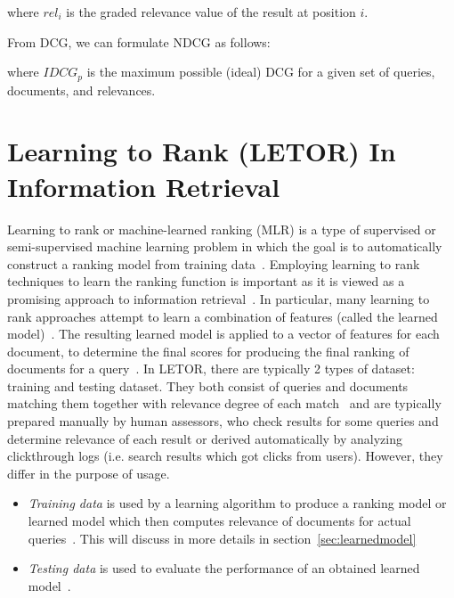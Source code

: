 \begin{center}
\end{center}

where $rel_{i}$ is the graded relevance value of the result at position $i$.

From DCG, we can formulate NDCG as follows:
\begin{center}
\end{center}
where $IDCG_p$ is the maximum possible (ideal) DCG for a given set of queries, documents, and relevances.


\section{Learning to Rank (LETOR) In Information Retrieval}\label{sec:letor}
Learning to rank or machine-learned ranking (MLR) is a type of supervised or semi-supervised machine learning problem in which the goal is 
to automatically construct a ranking model from training data~\cite{letor}.
Employing learning to rank techniques to learn the ranking function is important as it is viewed as
a promising approach to information retrieval~\cite{letor}. In particular, many learning to rank approaches attempt to learn a combination of features
(called the learned model)~\cite[P. 3]{learningmodel}. The resulting learned model is applied to a vector of features for each document, to determine the final scores for 
producing the final ranking of documents for a query~\cite[P. 3]{learningmodel}. In LETOR, there are typically 2 types of dataset: training and testing dataset.
They both consist of queries and documents matching them together with relevance degree of each match~\cite{letorWiki} and are typically
prepared manually by human assessors, who check results for some queries and determine relevance of each result or 
derived automatically by analyzing clickthrough logs (i.e. search results which got clicks from users). However, they differ in the purpose of usage.
\begin{itemize}
 \item \textit{Training data} is used by a learning algorithm to produce a ranking model or learned model which then computes relevance of documents 
 for actual queries~\cite{letorWiki}. This will discuss in more details in section~\ref{sec:learnedmodel}
 \item \textit{Testing data} is used to evaluate the performance of an obtained learned model~\cite{craig}.
\end{itemize}

